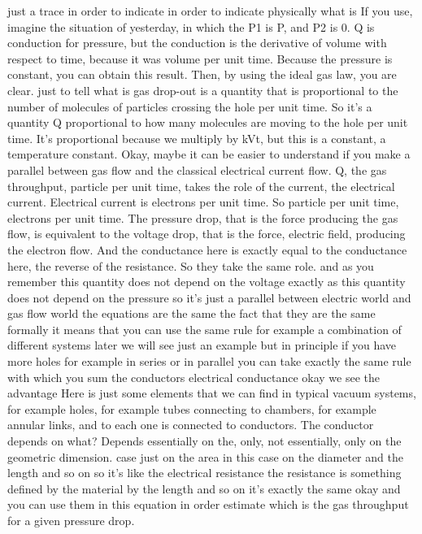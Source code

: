just a trace in order to indicate in order to indicate physically what is If you use, imagine the situation of yesterday, in which the P1 is P, and P2 is 0. Q is conduction for pressure, but the conduction is the derivative of volume with respect to time, because it was volume per unit time. Because the pressure is constant, you can obtain this result. Then, by using the ideal gas law, you are clear. just to tell what is gas drop-out is a quantity that is proportional to the number of molecules of particles crossing the hole per unit time. So it's a quantity Q proportional to how many molecules are moving to the hole per unit time. It's proportional because we multiply by kVt, but this is a constant, a temperature constant.
Okay, maybe it can be easier to understand if you make a parallel between gas flow and the classical electrical current flow. Q, the gas throughput, particle per unit time, takes the role of the current, the electrical current. Electrical current is electrons per unit time. So particle per unit time, electrons per unit time. The pressure drop, that is the force producing the gas flow, is equivalent to the voltage drop, that is the force, electric field, producing the electron flow. And the conductance here is exactly equal to the conductance here, the reverse of the resistance. So they take the same role. and as you remember this quantity does not depend on the voltage exactly as this quantity does not depend on the pressure so it's just a parallel between electric world and gas flow world the equations are the same the fact that they are the same formally it means that you can use the same rule for example a combination of different systems later we will see just an example but in principle if you have more holes for example in series or in parallel you can take exactly the same rule with which you sum the conductors electrical conductance okay we see the advantage Here is just some elements that we can find in typical vacuum systems, for example holes, for example tubes connecting to chambers, for example annular links, and to each one is connected to conductors. The conductor depends on what? Depends essentially on the, only, not essentially, only on the geometric dimension. case just on the area in this case on the diameter and the length and so on so it's like the electrical resistance the resistance is something defined by the material by the length and so on it's exactly the same okay and you can use them in this equation in order estimate which is the gas throughput for a given pressure drop.
